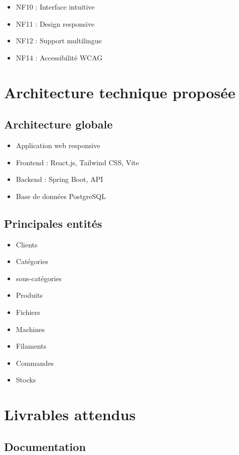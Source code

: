 \documentclass[12pt,a4paper]{article}
\begin{document}
\begin{itemize}
\item NF10 : Interface intuitive
\item NF11 : Design responsive
\item NF12 : Support multilingue
\item NF14 : Accessibilité WCAG
\end{itemize}

\section{Architecture technique proposée}

\subsection{Architecture globale}

\begin{itemize}
\item Application web responsive
\item Frontend : React.js, Tailwind CSS, Vite
\item Backend : Spring Boot, API
\item Base de données PostgreSQL
\end{itemize}

\subsection{Principales entités}

\begin{itemize}
\item Clients
\item Catégories
\item sous-catégories
\item Produits
\item Fichiers 
\item Machines
\item Filaments
\item Commandes
\item Stocks
\end{itemize}

\section{Livrables attendus}

\subsection{Documentation}
\end{document}
